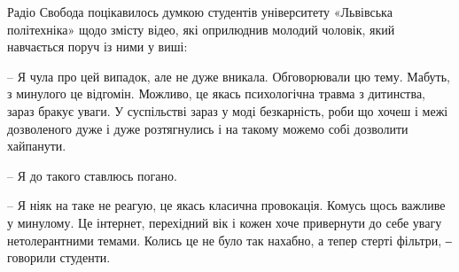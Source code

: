 \begin{multicols}{2}
Радіо Свобода поцікавилось думкою студентів університету «Львівська
політехніка» щодо змісту відео, які оприлюднив молодий чоловік, який навчається
поруч із ними у виші:

– Я чула про цей випадок, але не дуже вникала. Обговорювали цю тему. Мабуть, з
минулого це відгомін. Можливо, це якась психологічна травма з дитинства, зараз
бракує уваги. У суспільстві зараз у моді безкарність, роби що хочеш і межі
дозволеного дуже і дуже розтягнулись і на такому можемо собі дозволити
хайпанути.

– Я до такого ставлюсь погано.

– Я ніяк на таке не реагую, це якась класична провокація. Комусь щось важливе у
минулому. Це інтернет, перехідний вік і кожен хоче привернути до себе увагу
нетолерантними темами. Колись це не було так нахабно, а тепер стерті фільтри, ‒
говорили студенти.


\end{multicols}
